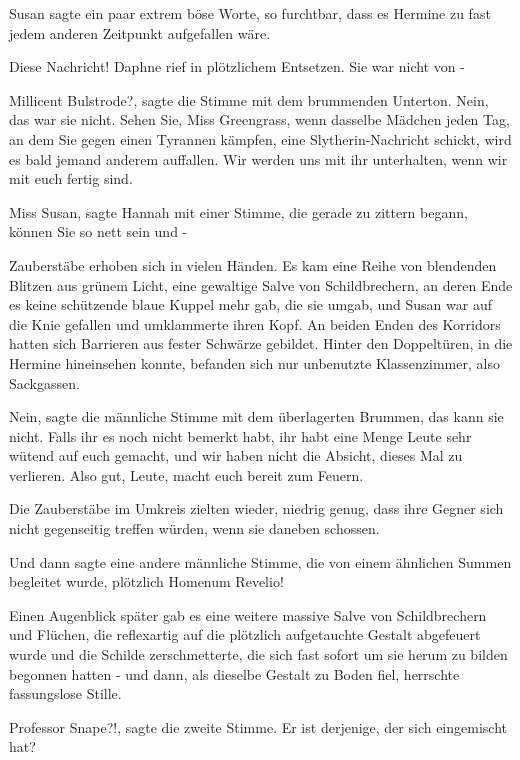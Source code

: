 Susan sagte ein paar extrem böse Worte, so furchtbar, dass es Hermine zu fast
jedem anderen Zeitpunkt aufgefallen wäre.

\glqq{}Diese Nachricht!\grqq{} Daphne rief in plötzlichem Entsetzen. \glqq{}Sie
war nicht von -\grqq{}

\glqq{}Millicent Bulstrode?\grqq{}, sagte die Stimme mit dem brummenden Unterton.
\glqq{}Nein, das war sie nicht. Sehen Sie, Miss Greengrass, wenn dasselbe Mädchen
jeden Tag, an dem Sie gegen einen Tyrannen kämpfen, eine Slytherin-Nachricht
schickt, wird es bald jemand anderem auffallen. Wir werden uns mit ihr
unterhalten, wenn wir mit euch fertig sind.\grqq{}

\glqq{}Miss Susan\grqq{}, sagte Hannah mit einer Stimme, die gerade zu zittern
begann, \glqq{}können Sie so nett sein und -\grqq{}

Zauberstäbe erhoben sich in vielen Händen. Es kam eine Reihe von blendenden
Blitzen aus grünem Licht, eine gewaltige Salve von Schildbrechern, an deren Ende
es keine schützende blaue Kuppel mehr gab, die sie umgab, und Susan war auf die
Knie gefallen und umklammerte ihren Kopf. An beiden Enden des Korridors hatten
sich Barrieren aus fester Schwärze gebildet. Hinter den Doppeltüren, in die
Hermine hineinsehen konnte, befanden sich nur unbenutzte Klassenzimmer, also
Sackgassen.

\glqq{}Nein\grqq{}, sagte die männliche Stimme mit dem überlagerten Brummen,
\glqq{}das kann sie nicht. Falls ihr es noch nicht bemerkt habt, ihr habt eine
Menge Leute sehr wütend auf euch gemacht, und wir haben nicht die Absicht,
dieses Mal zu verlieren. Also gut, Leute, macht euch bereit zum Feuern.\grqq{}

Die Zauberstäbe im Umkreis zielten wieder, niedrig genug, dass ihre Gegner sich
nicht gegenseitig treffen würden, wenn sie daneben schossen.

Und dann sagte eine andere männliche Stimme, die von einem ähnlichen Summen
begleitet wurde, plötzlich \glqq{}Homenum Revelio!\grqq{}

Einen Augenblick später gab es eine weitere massive Salve von Schildbrechern und
Flüchen, die reflexartig auf die plötzlich aufgetauchte Gestalt abgefeuert wurde
und die Schilde zerschmetterte, die sich fast sofort um sie herum zu bilden
begonnen hatten - und dann, als dieselbe Gestalt zu Boden fiel, herrschte
fassungslose Stille.

\glqq{}Professor Snape?!\grqq{}, sagte die zweite Stimme. \glqq{}Er ist derjenige,
der sich eingemischt hat?\grqq{}

